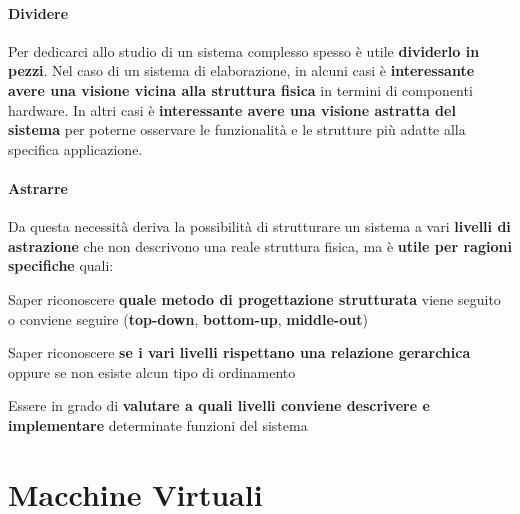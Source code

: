 \documentclass[10pt]{report}
\begin{document}
\paragraph{Dividere} Per dedicarci allo studio di un sistema complesso spesso è utile \textbf{dividerlo in pezzi}. Nel caso di un sistema di elaborazione, in alcuni casi è \textbf{interessante avere una visione vicina alla struttura fisica} in termini di componenti hardware. In altri casi è \textbf{interessante avere una visione astratta del sistema} per poterne osservare le funzionalità e le strutture più adatte alla specifica applicazione.
\paragraph{Astrarre} Da questa necessità deriva la possibilità di strutturare un sistema a vari \textbf{livelli di astrazione} che non descrivono una reale struttura fisica, ma è \textbf{utile per ragioni specifiche} quali:
\begin{list}{}{}
\item Saper riconoscere \textbf{quale metodo di progettazione strutturata} viene seguito o conviene seguire (\textbf{top-down}, \textbf{bottom-up}, \textbf{middle-out})
\item Saper riconoscere \textbf{se i vari livelli rispettano una relazione gerarchica} oppure se non esiste alcun tipo di ordinamento
\item Essere in grado di \textbf{valutare a quali livelli conviene descrivere e implementare} determinate funzioni del sistema
\end{list}
\section{Macchine Virtuali}
\end{document}
